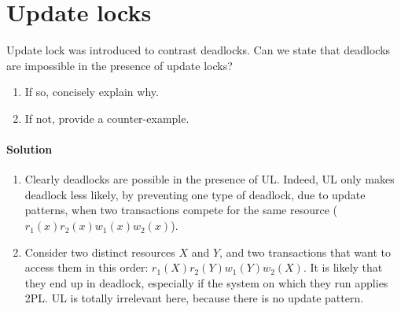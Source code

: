 \section{Update locks}

Update lock was introduced to contrast deadlocks. Can we state that deadlocks are impossible in the presence of update locks?
\begin{enumerate}
    \item If so, concisely explain why. 
    \item If not, provide a counter-example.
\end{enumerate}

\paragraph*{Solution}
\begin{enumerate}
    \item Clearly deadlocks are possible in the presence of UL. Indeed, UL only makes deadlock less likely, by preventing one type of deadlock, due to 
        update patterns, when two transactions compete for the same resource ($r_1(x) r_2(x) w_1(x) w_2(x)$). 
    \item Consider two distinct resources $X$ and $Y$, and two transactions that want to access them in this order: $r_1(X) r_2(Y) w_1(Y) w_2(X)$. It is likely that they end up 
        in deadlock, especially if the system on which they run applies 2PL. UL is totally irrelevant here, because there is no update pattern. 
\end{enumerate}